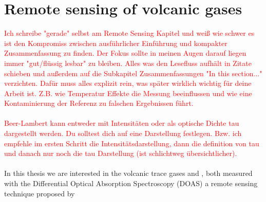 \documentclass  [
  paper    = a4,
  BCOR     = 10mm,
  twoside,
  fontsize = 12pt,
  fleqn,
  toc      = bibnumbered,
  toc      = listofnumbered,
  numbers  = noendperiod,
  headings = normal,
  listof   = leveldown,
  version  = 3.03
]                                       {scrreprt}
\begin{document}
	\chapter{Remote sensing of volcanic gases}
	\textcolor{red}{Ich schreibe "gerade" selbst am Remote Sensing Kapitel und weiß wie schwer es ist den Kompromiss zwischen  ausführlicher Einführung und kompakter Zusammenfassung zu finden. Der Fokus sollte in meinen Augen darauf liegen immer "gut/flüssig lesbar" zu bleiben. Alles was den Lesefluss aufhält in Zitate schieben und außerdem auf die Subkapitel Zusammenfassungen "In this section..." verzichten. Dafür muss alles explizit rein, was später wirklich wichtig für deine Arbeit ist. Z.B. wie Temperatur Effekte die Messung beeinflussen und wie eine Kontaminierung der Referenz zu falschen Ergebnissen führt.}\\
	\\
	\textcolor{red}{Beer-Lambert kann entweder mit Intensitäten oder als optische Dichte tau dargestellt werden. Du solltest dich auf eine Darstellung festlegen. Bzw. ich empfehle im ersten Schritt die Intensitätsdarstellung, dann die definition von tau und danach nur noch die tau Darstellung (ist schlichtweg übersichtlicher).}\\
	\\
	In this thesis we are interested in the volcanic trace gases  and , both measured with the Differential Optical Absorption Spectroscopy (DOAS) a remote sensing technique proposed by \cite{platt1980observations}
	
\end{document}
